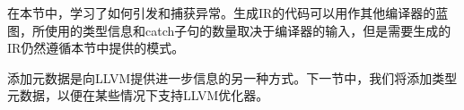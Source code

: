 在本节中，学习了如何引发和捕获异常。生成IR的代码可以用作其他编译器的蓝图，所使用的类型信息和catch子句的数量取决于编译器的输入，但是需要生成的IR仍然遵循本节中提供的模式。

添加元数据是向LLVM提供进一步信息的另一种方式。下一节中，我们将添加类型元数据，以便在某些情况下支持LLVM优化器。









































